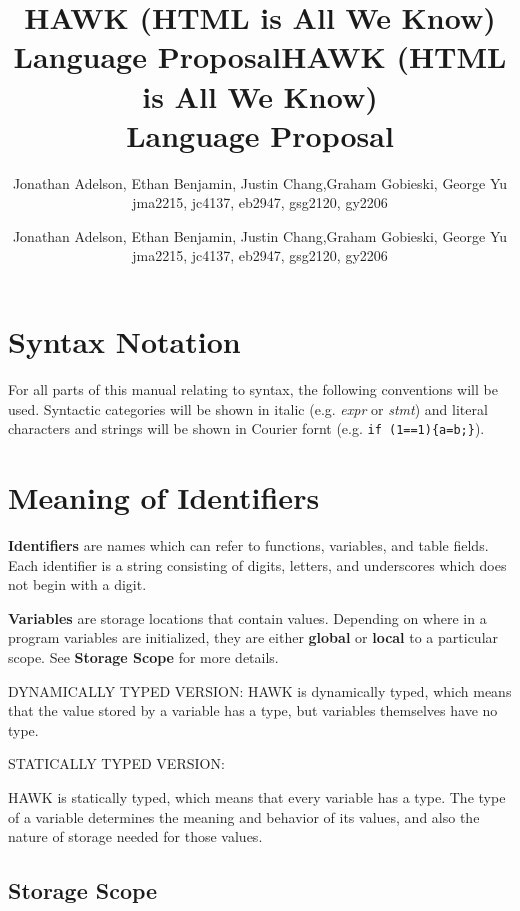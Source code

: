 \documentclass[12pt]{article}
\title{HAWK (HTML is All We Know)\\
Language Proposal}
\author{Jonathan Adelson, Ethan Benjamin, Justin Chang,Graham Gobieski, George Yu\\
jma2215, jc4137, eb2947, gsg2120, gy2206}
\date{}
\newcommand{\setdocdata}{
\title{HAWK (HTML is All We Know)\\
Language Proposal}
\author{Jonathan Adelson, Ethan Benjamin, Justin Chang,Graham Gobieski, George Yu\\
jma2215, jc4137, eb2947, gsg2120, gy2206}
\date{}
}
\begin{document}


\setdocdata
\maketitle

\section*{Syntax Notation}

For all parts of this manual relating to syntax, the following conventions will be used. Syntactic categories will be shown in italic (e.g. \textit{expr} or \textit{stmt}) and literal characters and strings will be shown in Courier fornt (e.g. \texttt{if (1==1)\{a=b;\}}).

\section*{Meaning of Identifiers}

\textbf{Identifiers} are names which can refer to functions, variables, and table fields. Each identifier is a string consisting of digits, letters, and underscores which does not begin with a digit.

\textbf{Variables} are storage locations that contain values. Depending on where in a program variables are initialized, they are either \textbf{global} or \textbf{local} to a particular scope. See \textbf{Storage Scope} for more details.

DYNAMICALLY TYPED VERSION:
HAWK is dynamically typed, which means that the value stored by a variable has a type, but variables themselves have no type. 

STATICALLY TYPED VERSION:

HAWK is statically typed, which means that every variable has a type. The type of a variable determines the meaning and behavior of its values, and also the nature of storage needed for those values. 


\subsection*{Storage Scope}
\end{document}
